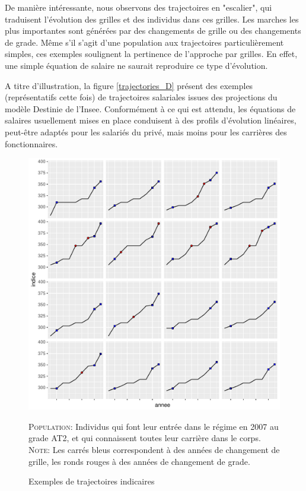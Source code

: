 \documentclass[11pt,a4paper]{article}
\begin{document}
De manière intéressante, nous observons des trajectoires en "escalier", qui traduisent l'évolution des grilles et des individus dans ces grilles. Les marches les plus importantes sont générées par des changements de grille ou des changements de grade. Même s'il s'agit d'une population aux trajectoires particulièrement simples, ces exemples soulignent la pertinence de l'approche par grilles. En effet, une simple équation de salaire ne saurait reproduire ce type d'évolution. 

A titre d'illustration, la figure \ref{trajectories_D} présent des exemples (représentatifs cette fois) de trajectoires salariales issues des projections du modèle Destinie de l'Insee. Conformément à ce qui est attendu, les équations de salaires usuellement mises en place conduisent à des profils d'évolution linéaires, peut-être  adaptés pour les salariés du privé, mais moins pour les carrières des fonctionnaires. 


\begin{figure}[H] 
\caption{Exemples de trajectoires indicaires}
\label{trajectories} 
\includegraphics[width=1\linewidth]{trajectoires.pdf} 
\begin{minipage}{15cm}
\footnotesize
\textsc{Population:} Individus qui font leur entrée dans le régime en 2007 au grade AT2, et qui connaissent toutes leur carrière dans le corps. \\
\textsc{Note:} Les carrés bleus correspondent à des années de changement de grille, les ronds rouges à des années de changement de grade. 
\end{minipage}
\end{figure}
\end{document}
